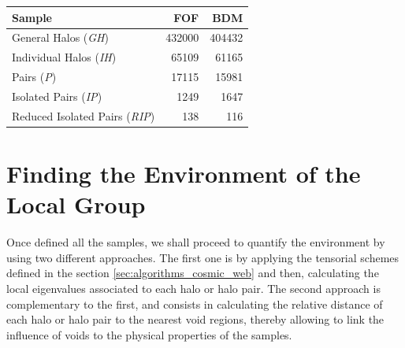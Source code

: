 \documentclass[usenatbib]{latex/mn2e}
\begin{document}
\begin{table}[H]
\begin{flushleft}
\begin{center}
  \begin{tabular}{l  r  r} \hline
	\textbf{Sample}					&\textbf{FOF}&\textbf{BDM} \\ \hline
	General Halos (\textit{GH}) 	& 432000	 & 404432  \\ 
	Individual Halos (\textit{IH}) 	& 65109		 & 61165  \\ 
	Pairs (\textit{P}) 	 			& 17115		 & 15981  \\ 
	Isolated Pairs (\textit{IP})	& 1249		 & 1647  \\ 
	Reduced Isolated Pairs (\textit{RIP})& 138	 & 116  \\ \hline
  \end{tabular}  
  
  \label{Tab:Samples_Size}
  
\end{center}
\end{flushleft}
\end{table}


\section{Finding the Environment of the Local Group}
\label{sec:LGEnvironment}



Once defined all the samples, we shall proceed to quantify the environment
by using two different approaches. The first one is by applying the 
tensorial schemes defined in the section \ref{sec:algorithms_cosmic_web} 
and then, calculating the local eigenvalues associated to each halo or halo 
pair. The second approach is complementary to the first, and consists in 
calculating the relative distance of each halo or halo pair to the nearest
void regions, thereby allowing to link the influence of voids to the 
physical properties of the samples.
\end{document}
